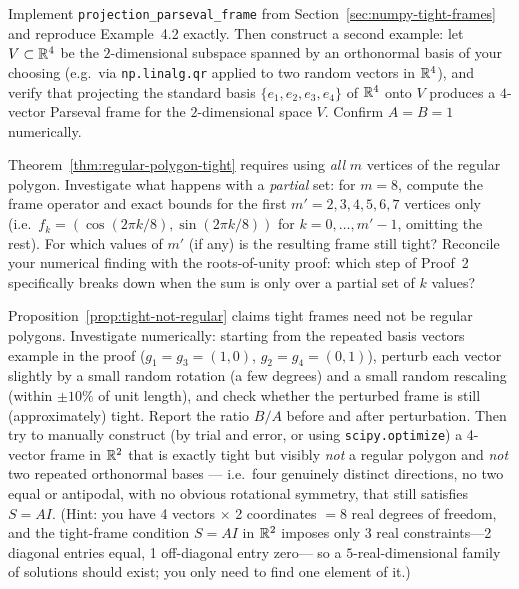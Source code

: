 \begin{exercisebox}[title={Lab Exercise 4.2: Verifying the Projection Construction}]
Implement \texttt{projection\_parseval\_frame} from
Section~\ref{sec:numpy-tight-frames} and reproduce Example~4.2 exactly.
Then construct a second example: let $V\subset\mathbb{R}^4$ be the
$2$-dimensional subspace spanned by an orthonormal basis of your choosing
(e.g.\ via \texttt{np.linalg.qr} applied to two random vectors in
$\mathbb{R}^4$), and verify that projecting the standard basis $\{e_1,e_2,e_3,e_4\}$
of $\mathbb{R}^4$ onto $V$ produces a $4$-vector Parseval frame for the
$2$-dimensional space $V$. Confirm $A=B=1$ numerically.
\end{exercisebox}

\begin{exercisebox}[title={Lab Exercise 4.3: Partial Regular Polygons Are Not Tight}]
Theorem~\ref{thm:regular-polygon-tight} requires using \emph{all} $m$
vertices of the regular polygon. Investigate what happens with a
\emph{partial} set: for $m=8$, compute the frame operator and exact
bounds for the first $m'=2,3,4,5,6,7$ vertices only (i.e.\
$f_k=(\cos(2\pi k/8),\sin(2\pi k/8))$ for $k=0,\ldots,m'-1$, omitting the
rest). For which values of $m'$ (if any) is the resulting frame still
tight? Reconcile your numerical finding with the roots-of-unity proof:
which step of Proof~2 specifically breaks down when the sum is only over
a partial set of $k$ values?
\end{exercisebox}

\begin{exercisebox}[title={Lab Exercise 4.4: Hunting for Asymmetric Tight Frames}]
Proposition~\ref{prop:tight-not-regular} claims tight frames need not be
regular polygons. Investigate numerically: starting from the repeated
basis vectors example in the proof
($g_1=g_3=(1,0)$, $g_2=g_4=(0,1)$), perturb each vector slightly by a
small random rotation (a few degrees) and a small random rescaling
(within $\pm10\%$ of unit length), and check whether the perturbed frame
is still (approximately) tight. Report the ratio $B/A$ before and after
perturbation. Then try to manually construct (by trial and error, or
using \texttt{scipy.optimize}) a 4-vector frame in $\mathbb{R}^2$ that is exactly
tight but visibly \emph{not} a regular polygon and \emph{not} two
repeated orthonormal bases --- i.e.\ four genuinely distinct directions,
no two equal or antipodal, with no obvious rotational symmetry, that
still satisfies $S=AI$. (Hint: you have 4 vectors $\times$ 2 coordinates
$=8$ real degrees of freedom, and the tight-frame condition $S=AI$ in
$\mathbb{R}^2$ imposes only 3 real constraints---2 diagonal entries equal, 1
off-diagonal entry zero--- so a $5$-real-dimensional family of solutions
should exist; you only need to find one element of it.)
\end{exercisebox}

